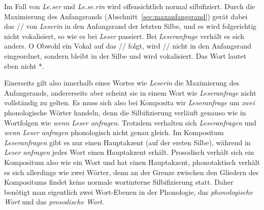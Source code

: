 \begin{exe}
  \ex\label{ex:phol8945}
  \begin{xlist}
  \end{xlist}
\end{exe}

Im Fall von \textit{Le.ser} und \textit{Le.se.rin} wird offensichtlich normal silbifiziert.
Durch die Maximierung des Anfangsrands (Abschnitt~\ref{sec:maxanfangsrand}) gerät dabei das // von \textit{Leserin} in den Anfangsrand der letzten Silbe, und es wird folgerichtig nicht vokalisiert, so wie es bei \textit{Leser} passiert.
Bei \textit{Leseranfrage} verhält es sich anders. O
Obwohl ein Vokal auf das // folgt, wird // nicht in den Anfangsrand eingeordnet, sondern bleibt in der Silbe \textipa{[z5]} und wird vokalisiert.
Das Wort lautet eben nicht *.

Einerseits gilt also innerhalb eines Wortes wie \textit{Leserin} die Maximierung des Anfangsrands, andererseits aber scheint sie in einem Wort wie \textit{Leseranfrage} nicht vollständig zu gelten.
Es muss sich also bei Komposita wir \textit{Leseranfrage} um \textit{zwei} phonologische Wörter handeln, denn die Silbifizierung verläuft genauso wie in Wortfolgen wie \textit{wenn Leser anfragen}.
Trotzdem verhalten sich \textit{Leseranfragen} und \textit{wenn Leser anfragen} phonologisch nicht genau gleich.
Im Kompositum \textit{Leseranfragen} gibt es nur einen Hauptakzent (auf der ersten Silbe), während in \textit{Leser anfragen} jedes Wort einen Hauptakzent erhält.
Prosodisch verhält sich ein Kompositum also wie ein Wort und hat einen Hauptakzent, phonotaktisch verhält es sich allerdings wie zwei Wörter, denn an der Grenze zwischen den Gliedern des Kompositums findet keine normale wortinterne Silbifizierung statt.
Daher benötigt man eigentlich zwei Wort-Ebenen in der Phonologie, das \textit{phonologische Wort} und das \textit{prosodische Wort}.


